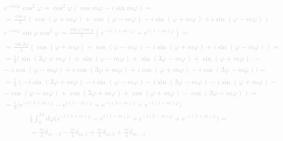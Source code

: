 %
\textcolor{lightgray}{ \begin{equation*} \begin{aligned}
e^{-i m \varphi} \cos^2 \varphi = \cos^2 \varphi
\left( \cos m \varphi - i \sin m \varphi \right) = \\ = \frac{\cos \varphi}{2} 
\left( \cos (\varphi + m \varphi) + \cos (\varphi - m \varphi) - 
i \sin (\varphi + m \varphi) + i \sin (\varphi - m \varphi) \right)
\end{aligned} \end{equation*} }
%
\textcolor{lightgray}{ \begin{equation*} \begin{aligned}
e^{-i m \varphi} \sin \varphi \cos^2 \varphi = 
\frac{ \sin \varphi \cos \varphi } { 2 } 
\left( e^{-i (1+m) \varphi} + e^{i (1-m) \varphi} \right) = \\
= \frac{ \sin 2 \varphi } { 4 } 
\left( \cos (\varphi + m \varphi) + \cos (\varphi - m \varphi) - 
i \sin (\varphi + m \varphi) + i \sin (\varphi - m \varphi) \right) = \\
= \frac{1}{8} \big( \sin (3 \varphi + m \varphi) + 
\sin (\varphi - m \varphi) + \sin (3 \varphi - m \varphi) + 
\sin (\varphi + m \varphi) \big. - \\ 
- \big. i \cos (\varphi - m \varphi) + i \cos (3 \varphi + m \varphi) + 
i \cos (\varphi + m \varphi) - i \cos (3 \varphi - m \varphi) \big) = \\
= \frac{i}{8} \left( - i \sin (3 \varphi + m \varphi) - i 
\sin (\varphi - m \varphi) - i \sin (3 \varphi - m \varphi) - i 
\sin (\varphi + m \varphi) \right. - \\ 
- \left. \cos (\varphi - m \varphi) + \cos (3 \varphi + m \varphi) + 
\cos (\varphi + m \varphi) - \cos (3 \varphi - m \varphi) \right) = \\
= \frac{i}{8} \big( e^{-i (3+m) \varphi} - e^{i (1-m) \varphi} + 
e^{-i (3-m) \varphi} + e^{-i (1+m) \varphi} \big)
\end{aligned} \end{equation*} }
%
\textcolor{lightgray}{ \begin{equation*} \begin{aligned}
\frac{i}{8} \int_{0}^{2 \pi} d \varphi \big( e^{-i (3+m) \varphi} - 
e^{i (1-m) \varphi} + e^{-i (3-m) \varphi} + e^{-i (1+m) \varphi} \big) = \\
= \frac{\pi i }{4} \delta_{m,-3} - \frac{\pi i }{4} \delta_{m,1} + 
\frac{\pi i }{4} \delta_{m,3} + \frac{\pi i }{4} \delta_{m,-1}
\end{aligned} \end{equation*} }
